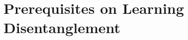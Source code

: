 \chapter{Prerequisites on Learning Disentanglement}\label{sec:prerequisites}
\begin{comment}
\section{Learning from Data}
	{Learning from data} is commonly understood as the ability of algorithms to improve their performance on a task with experience accumulated from the observation of data \cite{goodfellow16dlb}. The source of data is usually a dataset - set of data points $X = \{x_i | i \in \{1\ldots n\} \}$, which are sampled from a probability distribution $x_i \sim p(x)$.

	\subsection{Supervised}\label{sec:supervised}
		The term {supervised learning} denotes the task to learn a mapping from data points $x_i$ to target labels $y_i$.
		A supervised algorithm has access to data-label pairs  $(y_i, x_i) \sim p(y, x)$, in order to estimate the connection between data points and labels, either in form of a conditional probability $p(y|x)$, or in form of a deterministic function $y = f(x)$.
		The label $y$ can be either discrete (\eg information about an object class) or continuous (\eg the location of an object part in an image).
		Recent advances, in particular the effectiveness of neural network models (cf. sec. \ref{sec:neuralnetworks}) on big datasets, have led to huge progress on problems that can be formulated as regression or classification. That is why on many traditional computer vision problems, such as \eg object recognition, image classification or human pose estimation, machines are now performing on a superhuman level; hence, these problems are now considered to be essentially solved.\\
		The Achilles' heel of supervised learning lies in the need for a viable supervision signal. To get labels, it is usually required to manually annotate the data. The human effort in this is costly, error-prone and not scalable to the ever-growing vast amounts of raw data.


\end{comment}
